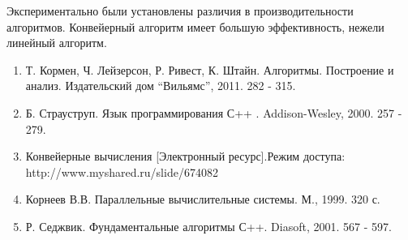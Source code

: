 Экспериментально были установлены различия в производительности алгоритмов. Конвейерный алгоритм  имеет большую эффективность, нежели линейный алгоритм. 

	\begin{enumerate}

		\item Т. Кормен, Ч. Лейзерсон, Р. Ривест, К. Штайн. Алгоритмы. Построение и анализ. Издательский дом ``Вильямс'', 2011. 282 - 315.
		\item Б. Страуструп. Язык программирования С++ . Addison-Wesley, 2000. 257 - 279.
		\item Конвейерные вычисления [Электронный ресурс].Режим доступа: http://www.myshared.ru/slide/674082 
		\item Корнеев В.В. Параллельные вычислительные системы. М., 1999. 320 с.
		\item Р. Седжвик. Фундаментальные алгоритмы С++. Diasoft, 2001. 567 - 597.

	\end{enumerate}



